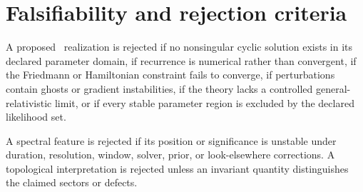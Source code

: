 \section{Falsifiability and rejection criteria}
\label{sec:falsifiability}

A proposed \SCPC\ realization is rejected if no nonsingular cyclic solution exists in its declared parameter domain, if recurrence is numerical rather than convergent, if the Friedmann or Hamiltonian constraint fails to converge, if perturbations contain ghosts or gradient instabilities, if the theory lacks a controlled general-relativistic limit, or if every stable parameter region is excluded by the declared likelihood set.

A spectral feature is rejected if its position or significance is unstable under duration, resolution, window, solver, prior, or look-elsewhere corrections. A topological interpretation is rejected unless an invariant quantity distinguishes the claimed sectors or defects.
